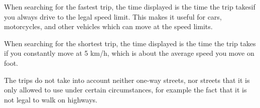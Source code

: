 When searching for the fastest trip, the time displayed is the time the trip takesif you always drive to the legal speed limit. This makes it useful for cars, motorcycles, and other vehicles which can move at the speed limits.

When searching for the shortest trip, the time displayed is the time the trip takes if you constantly move at 5 km/h, which is about the average speed you move on foot.

The trips do not take into account neither one-way streets, nor streets that it is only allowed to use under certain circumstances, for example the fact that it is not legal to walk on highways.